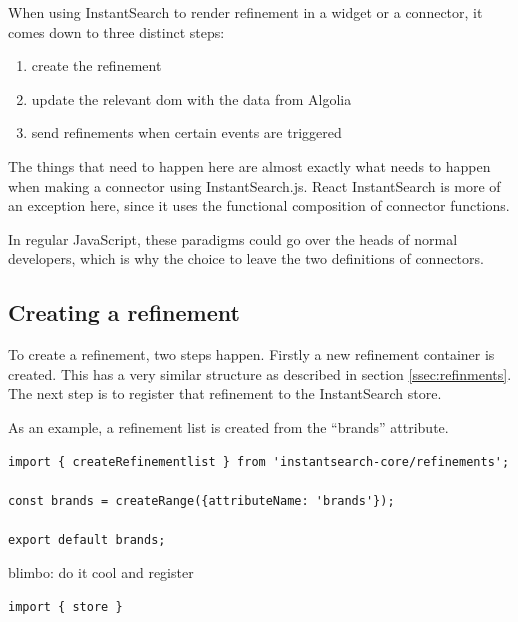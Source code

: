 When using InstantSearch to render refinement in a widget or a connector, it comes down to three distinct steps:

\begin{enumerate}
  \item create the refinement
  \item update the relevant \acrshort{dom} with the data from Algolia
  \item send \glspl{refinement} when certain events are triggered
\end{enumerate}

The things that need to happen here are almost exactly what needs to happen when making a connector using InstantSearch.js. React InstantSearch is more of an exception here, since it uses the functional composition of connector functions.

In regular JavaScript, these paradigms could go over the heads of normal developers, which is why the choice to leave the two definitions of connectors.

\subsection{Creating a refinement}
\label{subs:creating_a_refinement}

To create a refinement, two steps happen. Firstly a new refinement container is created. This has a very similar structure as described in section \ref{ssec:refinments}. The next step is to register that refinement to the InstantSearch store.

As an example, a refinement list is created from the ``brands'' attribute. %

\begin{minipage}{\linewidth}
\begin{lstlisting}[caption={Creating a refinement},label={lst:creating-refinement}]
import { createRefinementlist } from 'instantsearch-core/refinements';

const brands = createRange({attributeName: 'brands'});

export default brands;
\end{lstlisting}
\end{minipage}

blimbo: do it cool and register %

\begin{minipage}{\linewidth}
\begin{lstlisting}[caption={Registering a refinement},label={lst:registering-refinement}]
import { store } 
\end{lstlisting}
\end{minipage}

